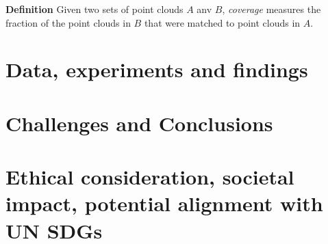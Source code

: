 \documentclass[12pt]{article}
\newcommand{\contentdescription}[1]{}
\begin{document}
    \textbf{Definition} Given two sets of point clouds $A$ anv $B$, \emph{coverage} measures the fraction of the point clouds in $B$ that were matched to point clouds in $A$.


    \section{Data, experiments and findings}
    \contentdescription{
        Data, experiments and findings (30-40\%):

        Describe the data you are working with for your project.
        What type of data is it?
        Where did it come from?
        How much data are you working with?
        Did you have to do any preprocessing, filtering, or other special treatment to use this data in your project?
        Describe and present the experiments that you performed and what is the reason for those experiments.
        Where applicable define evaluation metrics that you used. Discuss the results that you got.
    }


    \section{Challenges and Conclusions}
    \contentdescription{
        Challenges and Conclusions (5-15\%):
        Challenges you faced when reimplementing the paper and conducting the experiments.
        Were all details in the paper?
        Or did you have to look in the authors code or even contact them to find about some details?
        Was parts of the code quite hard to get them to work as intended?
        Did you have optimize and tune several hyperparameters?
        Which ones?
        Did the framework you used make the implementation difficult in some ways?

        Summarize your key results - what have you learned?
        What points do you think one should consider when using the approach of the paper you chose for your project?
        Suggest ideas for future extensions or new applications of your ideas.
    }


    \section{Ethical consideration, societal impact, potential alignment with UN SDGs}
    \contentdescription{
        Ethical consideration, societal impact, potential alignment with UN SDGs (5-10\%):
        Think and research!
        Are there any ethical considerations for the original paper, its problem or method, its way of conducting experiments?
        How about your task, your datasets, and the experiments you did?
        What societal impact can you imagine about the original paper and its contributions and results?
        How about your project report?
        How do you think this paper can push the UN SDG targets?
    }
\end{document}
